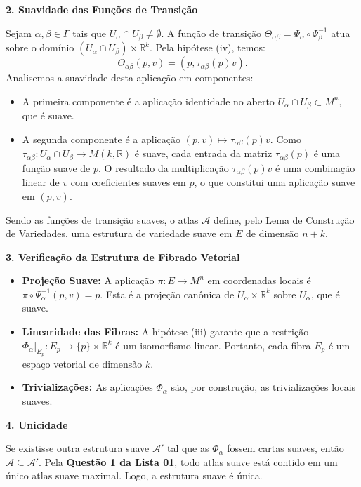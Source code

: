 {	\textbf{2. Suavidade das Funções de Transição}
	
	Sejam $\alpha, \beta \in \Gamma$ tais que $U_\alpha \cap U_\beta \neq \emptyset$. A função de transição $\Theta_{\alpha\beta} = \Psi_\alpha \circ \Psi_\beta^{-1}$ atua sobre o domínio $(U_\alpha \cap U_\beta) \times \mathbb{R}^k$. Pela hipótese (iv), temos:
	\begin{equation*}
		\Theta_{\alpha\beta}(p, v) = (p, \tau_{\alpha\beta}(p)v).
	\end{equation*}
	Analisemos a suavidade desta aplicação em componentes:
	\begin{itemize}
		\item A primeira componente é a aplicação identidade no aberto $U_\alpha \cap U_\beta \subset M^n$, que é suave.
		\item A segunda componente é a aplicação $(p, v) \mapsto \tau_{\alpha\beta}(p)v$. Como $\tau_{\alpha\beta} : U_\alpha \cap U_\beta \to M(k, \mathbb{R})$ é suave, cada entrada da matriz $\tau_{\alpha\beta}(p)$ é uma função suave de $p$. O resultado da multiplicação $\tau_{\alpha\beta}(p)v$ é uma combinação linear de $v$ com coeficientes suaves em $p$, o que constitui uma aplicação suave em $(p, v)$.
	\end{itemize}
	Sendo as funções de transição suaves, o atlas $\mathcal{A}$ define, pelo Lema de Construção de Variedades, uma estrutura de variedade suave em $E$ de dimensão $n+k$.
	
	\textbf{3. Verificação da Estrutura de Fibrado Vetorial}
	
	\begin{itemize}
		\item \textbf{Projeção Suave:} A aplicação $\pi : E \to M^n$ em coordenadas locais é $\pi \circ \Psi_\alpha^{-1}(p, v) = p$. Esta é a projeção canônica de $U_\alpha \times \mathbb{R}^k$ sobre $U_\alpha$, que é suave.
		\item \textbf{Linearidade das Fibras:} A hipótese (iii) garante que a restrição $\Phi_\alpha|_{E_p} : E_p \to \{p\} \times \mathbb{R}^k$ é um isomorfismo linear. Portanto, cada fibra $E_p$ é um espaço vetorial de dimensão $k$.
		\item \textbf{Trivializações:} As aplicações $\Phi_\alpha$ são, por construção, as trivializações locais suaves.
	\end{itemize}
	
	\textbf{4. Unicidade}
	
	Se existisse outra estrutura suave $\mathcal{A}'$ tal que as $\Phi_\alpha$ fossem cartas suaves, então $\mathcal{A} \subseteq \mathcal{A}'$. Pela \textbf{Questão 1 da Lista 01}, todo atlas suave está contido em um único atlas suave maximal. Logo, a estrutura suave é única.
}
